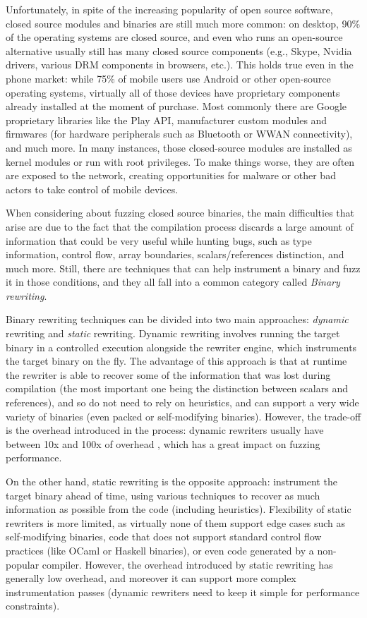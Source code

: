 \documentclass[a4paper,11pt,oneside]{report}
\begin{document}
Unfortunately, in spite of the increasing popularity of open source software, 
closed source modules and binaries are still much more common: on desktop, 90\% 
of the operating systems are closed source, and even who runs an open-source 
alternative usually still has many closed source components (e.g., Skype, 
Nvidia drivers, various DRM components in browsers, etc.). This holds true even 
in the phone market: while 75\% \cite{statista} of mobile users use Android or 
other open-source operating systems, virtually all of those devices have 
proprietary components already installed at the moment of purchase. Most 
commonly there are Google proprietary libraries like the Play API, manufacturer 
custom modules and firmwares (for hardware peripherals such as Bluetooth or 
WWAN connectivity), and much more. In many instances, those closed-source 
modules are installed as kernel modules or run with root privileges. To make 
things worse, they are often are exposed to the network, creating opportunities 
for malware or other bad actors to take control of mobile devices.

When considering about fuzzing closed source binaries, the main difficulties 
that arise are due to the fact that the compilation process discards a large 
amount of information that could be very useful while hunting bugs, such as 
type information, control flow, array boundaries, scalars/references 
distinction, and much more.  Still, there are techniques that can help 
instrument a binary and fuzz it in those conditions, and they all fall into a 
common category called \emph{Binary rewriting}.

Binary rewriting techniques can be divided into two main approaches: 
\emph{dynamic} rewriting and \emph{static} rewriting. Dynamic rewriting 
involves running the target binary in a controlled execution alongside the 
rewriter engine, which instruments the target binary on the fly. The advantage 
of this approach is that at runtime the rewriter is able to recover some of the 
information that was lost during compilation (the most important one being the 
distinction between scalars and references), and so do not need to rely on 
heuristics, and can support a very wide variety of binaries (even packed or 
self-modifying binaries). However, the trade-off is the overhead introduced in 
the process: dynamic rewriters usually have between 10x and 100x of overhead 
\cite{dinesh20oakland}, which has a great impact on fuzzing performance. 

On the other hand, static rewriting is the opposite approach: instrument the 
target binary ahead of time, using various techniques to recover as much 
information as possible from the code (including heuristics). Flexibility of 
static rewriters is more limited, as virtually none of them support edge cases 
such as self-modifying binaries, code that does not support standard control 
flow practices (like OCaml or Haskell binaries), or even code generated by a 
non-popular compiler. However, the overhead introduced by static rewriting has 
generally low overhead, and moreover it can support more complex 
instrumentation passes (dynamic rewriters need to keep it simple for 
performance constraints). 
\end{document}
